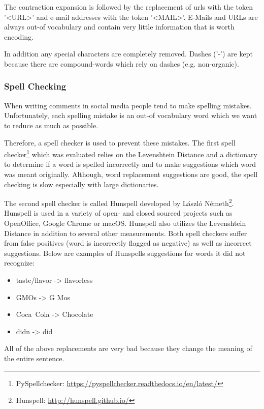 
The contraction expansion is followed by the replacement of \glspl{url} with the token '<URL>' and e-mail addresses with the token '<MAIL>'. E-Mails and URLs are always out-of vocabulary and contain very little information that is worth encoding. 
\medskip

In addition any special characters are completely removed. Dashes ('-') are kept because there are compound-words which rely on dashes (e.g. non-organic).

\subsubsection*{Spell Checking}
\label{sec:05_SpellChecking}
When writing comments in social media people tend to make spelling mistakes. Unfortunately, each spelling mistake is an out-of vocabulary word which we want to reduce as much as possible.

Therefore, a spell checker is used to prevent these mistakes. The first spell checker\footnote{PySpellchecker: \url{https://pyspellchecker.readthedocs.io/en/latest/}} which was evaluated relies on the Levenshtein Distance \cite{Levenshtein1966} and a dictionary to determine if a word is spelled incorrectly and to make suggestions which word was meant originally. Although, word replacement suggestions are good, the spell checking is slow especially with large dictionaries.
\medskip

The second spell checker is called Hunspell developed by László Németh\footnote{Hunspell: \hyperlink{http://hunspell.github.io/}{http://hunspell.github.io/}}. Hunspell is used in a variety of open- and closed sourced projects such as OpenOffice, Google Chrome or macOS. Hunspell also utilizes the Levenshtein Distance in addition to several other measurements. Both spell checkers suffer from false positives {(word is incorrectly flagged as negative)} as well as incorrect suggestions. Below are examples of Hunspells suggestions for words it did not recognize:

\begin{itemize}
	\item taste/flavor -> flavorless
	\item GMOs -> G Mos
	\item Coca~Cola -> Chocolate
	\item didn -> did
\end{itemize}

All of the above replacements are very bad because they change the meaning of the entire sentence.

